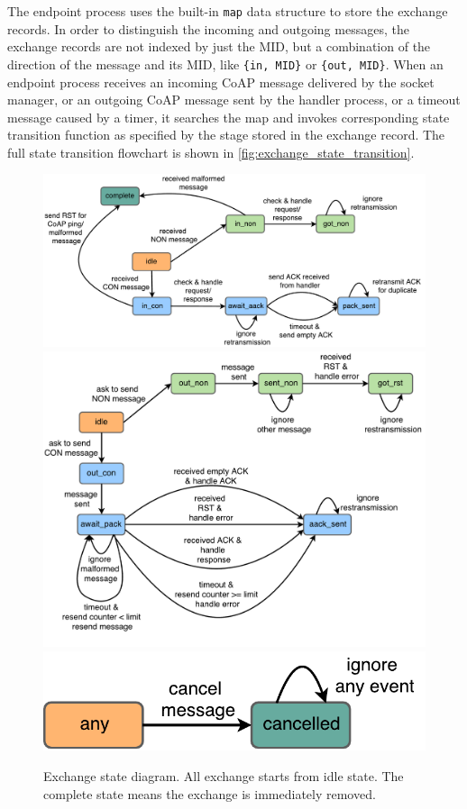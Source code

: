The endpoint process uses the built-in \verb|map| data structure to store the exchange records. In order to distinguish the incoming and outgoing messages, the exchange records are not indexed by just the MID, but a combination of the direction of the message and its MID, like \verb|{in, MID}| or \verb|{out, MID}|. When an endpoint process receives an incoming CoAP message delivered by the socket manager, or an outgoing CoAP message sent by the handler process, or a timeout message caused by a timer, it searches the map and invokes corresponding state transition function as specified by the stage stored in the exchange record. The full state transition flowchart is shown in \autoref{fig:exchange_state_transition}.

\begin{figure}[!htbp]
\centering
\includegraphics[scale = 0.55]{exchange_state_in}
\includegraphics[scale = 0.55]{exchange_state_out}
\includegraphics[scale = 0.55]{exchange_state_cancel}
\caption[Exchange state diagram]{Exchange state diagram. All exchange starts from idle state. The complete state means the exchange is immediately removed.}
\label{fig:exchange_state_transition}
\end{figure}

